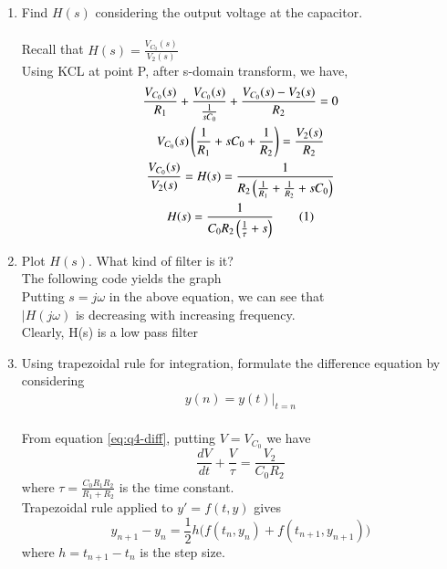 \documentclass[journal,12pt,twocolumn]{IEEEtran}
\renewcommand\thesection{\arabic{section}}
\begin{document}
\begin{enumerate}[label=\arabic*.,ref=\thesection.\theenumi]
\item Find $H(s)$ considering the output voltage at the capacitor. \\
	\solution \\
	Recall that \( H(s) = \frac{V_{C_0}(s)}{V_2(s)} \) \\
	Using KCL at point P, after s-domain transform, we have,
	\begin{gather*}
	    \frac{V_{C_0}(s)}{R_1} + \frac{V_{C_0}(s)}{\frac{1}{sC_0}} +
		\frac{V_{C_0}(s) - V_2(s)}{R_2} = 0\\
	    V_{C_0}(s) \brak{\frac{1}{R_1} + sC_0 + \frac{1}{R_2}} = \frac{V_2(s)}{R_2}\\
	    \frac{V_{C_0}(s)}{V_2(s)} = H(s) = \frac{1}{R_2\brak{\frac{1}{R_1} +
		\frac{1}{R_2} + sC_0}}\\
	    H(s) = \frac{1}{C_0 R_2\brak{\frac{1}{\tau} + s}} \numberthis \label{eq:q4-Hs}\\
	\end{gather*}


\item Plot $H(s)$.
What kind of filter is it? \\
	\solution The following code yields the graph \\
	Putting \( s = j\omega \) in the above equation, we can see that  \\
	\( |H(j\omega) \) is decreasing with increasing frequency. \\
	Clearly, H(s) is a low pass filter \\


\item Using trapezoidal rule for integration, formulate the difference equation by considering
	\begin{align}
		y(n) = y(t)\vert_{t=n}
	\end{align}
	\solution \\
	From equation \eqref{eq:q4-diff}, putting \( V = V_{C_0} \) we have
	\[ \frac{dV}{dt} + \frac{V}{\tau} = \frac{V_2}{C_0 R_2}  \]
	where \( \tau = \frac{C_0R_1R_2}{R_1+R_2} \) is the time constant. \\

	Trapezoidal rule applied to \( y' = f(t, y) \) gives 
	\[ y_{{n+1}} - y_{n} = \frac{1}{2} h {\Big (}f(t_{n},y_{n})+f(t_{{n+1}},y_{{n+1}}){\Big )} \]
	where \( h = t_{{n+1}} - t_{n} \) is the step size. \\


\end{enumerate}
\end{document}
